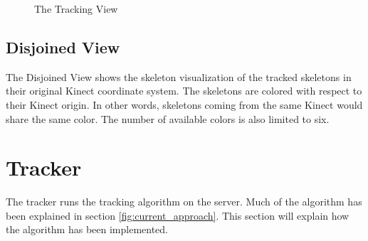 \begin{figure}[!h]
  \centering
  \caption{The Tracking View}
  \label{fig:tracking_view}
\end{figure}

\subsection{Disjoined View}
\label{sec:implementation_disjoined_view}

The Disjoined View shows the skeleton visualization of the tracked skeletons in their original Kinect coordinate system. The skeletons are colored with respect to their Kinect origin. In other words, skeletons coming from the same Kinect would share the same color. The number of available colors is also limited to six.

\section{Tracker}
\label{sec:implementation_tracker}

The tracker runs the tracking algorithm on the server. Much of the algorithm has been explained in section \ref{fig:current_approach}. This section will explain how the algorithm has been implemented.

